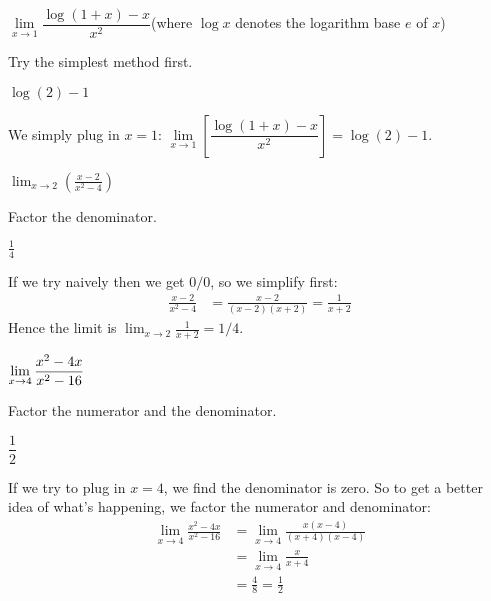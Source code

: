 \begin{question}[2012H]
$\lim\limits_{x\rightarrow 1}\dfrac{\log(1+x)-x}{x^2}$\quad (where $\log x$ denotes the logarithm base $e$ of $x$)
\end{question}
\begin{hint} Try the simplest method first.
\end{hint}
\begin{answer}
$\log(2)-1$
\end{answer}
\begin{solution}
We simply plug in $x=1$:
$\lim\limits_{x\rightarrow 1}\left[\dfrac{\log(1+x)-x}{x^2}\right]=\log(2)-1$.
\end{solution}



\begin{question}[2015Q]
$\displaystyle\lim_{x\rightarrow 2} \left(\frac{x-2}{x^2-4}\right)$
\end{question}
\begin{hint} Factor the denominator.
\end{hint}
\begin{answer} $\frac{1}{4}$
\end{answer}
\begin{solution}
If we try naively then we get $0/0$, so we simplify first:
\begin{align*}
  \frac{x-2}{x^2-4} &= \frac{x-2}{(x-2)(x+2)} = \frac{1}{x+2}
\end{align*}
Hence the limit is $\displaystyle \lim_{x\rightarrow2} \frac{1}{x+2} = 1/4$.\end{solution}


\begin{Mquestion}[2006H]
 $\displaystyle\lim\limits_{x\rightarrow 4}\dfrac{x^2-4x}{x^2-16}$
\end{Mquestion}
\begin{hint} Factor the numerator and the denominator.
\end{hint}
\begin{answer}
$\dfrac{1}{2}$
\end{answer}
\begin{solution}
If we try to plug in $x=4$, we find the denominator is zero. So to get a better idea of what's happening, we factor the numerator and denominator:
\begin{align*}
\lim\limits_{x\rightarrow 4}\frac{x^2-4x}{x^2-16}
		&=\lim\limits_{x\rightarrow 4}\frac{x(x-4)}{(x+4)(x-4)}\\
                 &=\lim\limits_{x\rightarrow 4}\frac{x}{x+4}\\
                 &=\frac{4}{8}=\frac{1}{2}
                 \end{align*}
\end{solution}


